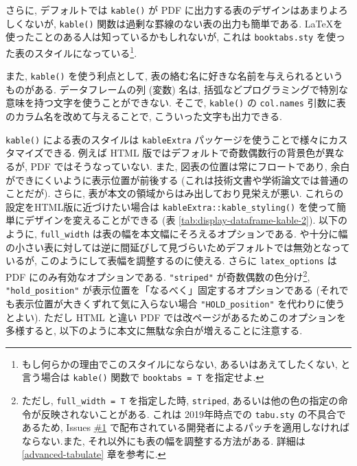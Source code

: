 \documentclass[
]{bxjsbook}
\theoremstyle{definition}
\theoremstyle{definition}
\theoremstyle{definition}
\theoremstyle{remark}
\begin{document}
さらに, デフォルトでは \texttt{kable()} が PDF
に出力する表のデザインはあまりよろしくないが, \texttt{kable()}
関数は過剰な罫線のない表の出力も簡単である.
\LaTeX を使ったことのある人は知っているかもしれないが, これは
\texttt{booktabs.sty} を使った表のスタイルになっている\footnote{もし何らかの理由でこのスタイルにならない,
  あるいはあえてしたくない, と言う場合は \texttt{kable()} 関数で
  \texttt{booktabs\ =\ T} を指定せよ.}.

また, \texttt{kable()} を使う利点として,
表の絡む名に好きな名前を与えられるというものがある. データフレームの列
(変数) 名は,
括弧などプログラミングで特別な意味を持つ文字を使うことができない.
そこで, \texttt{kable()} の \texttt{col.names}
引数に表のカラム名を改めて与えることで, こういった文字も出力できる.

\texttt{kable()} による表のスタイルは \texttt{kableExtra}
パッケージを使うことで様々にカスタマイズできる. 例えば HTML
版ではデフォルトで奇数偶数行の背景色が異なるが, PDF
ではそうなっていない. また, 図表の位置は常にフロートであり,
余白ができにくいように表示位置が前後する
(これは技術文書や学術論文では普通のことだが). さらに,
表が本文の領域からはみ出しており見栄えが悪い.
これらの設定をHTML版に近づけたい場合は
\texttt{kableExtra::kable\_styling()}
を使って簡単にデザインを変えることができる (表
\ref{tab:display-dataframe-kable-2}). 以下のように, \texttt{full\_width}
は表の幅を本文幅にそろえるオプションである.
や十分に幅の小さい表に対しては逆に間延びして見づらいためデフォルトでは無効となっているが,
このようにして表幅を調整するのに使える. さらに \texttt{latex\_options}
は PDF にのみ有効なオプションである. \texttt{"striped"}
が奇数偶数の色分け\footnote{ただし, \texttt{full\_width\ =\ T}
  を指定した時, \texttt{striped},
  あるいは他の色の指定の命令が反映されないことがある. これは
  2019年時点での \texttt{tabu.sty} の不具合であるため, Issues
  \href{https://github.com/tabu-issues-for-future-maintainer/tabu/issues/1\#issuecomment-464369706}{\#1}
  で配布されている開発者によるパッチを適用しなければならない.また,
  それ以外にも表の幅を調整する方法がある. 詳細は \ref{advanced-tabulate}
  章を参考に.}, \texttt{"hold\_position"}
が表示位置を「なるべく」固定するオプションである
(それでも表示位置が大きくずれて気に入らない場合
\texttt{"HOLD\_position"} を代わりに使うとよい). ただし HTML と違い PDF
では改ページがあるためこのオプションを多様すると,
以下のように本文に無駄な余白が増えることに注意する.
\end{document}
